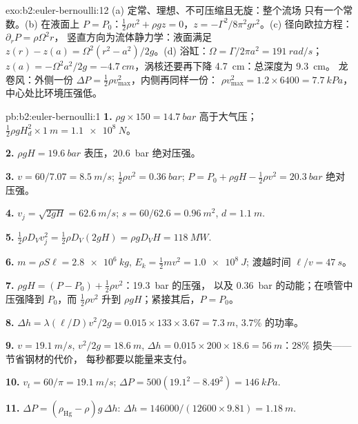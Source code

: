 \begin{solution}{exo:b2:euler-bernoulli:12}
(a) 定常、理想、不可压缩且无旋：整个流场
只有一个常数。(b) 在液面上 $P = P_0$：$\tfrac12\rho v^2 + \rho gz =
0$，$z = -\Gamma^2/8\pi^2gr^2$。(c) 径向欧拉方程：$\partial_rP = \rho\Omega^2r$，
竖直方向为流体静力学：液面满足 $z(r) - z(a) = \Omega^2(r^2 -
a^2)/2g$。(d) 浴缸：$\Omega = \Gamma/2\pi a^2 = \qty{191}{rad/s}$；$z(a) = -\Omega^2a^2/
2g = \qty{-4.7}{cm}$，涡核还要再下降 \qty{4.7}{cm}：总深度为 \qty{9.3}{cm}。
龙卷风：外侧一份 $\Delta P = \tfrac12\rho v_{\max}^2$，内侧再同样一份：
$\rho v_{\max}^2 = 1.2 \times 6400 = \qty{7.7}{kPa}$，中心处比环境压强低。
\end{solution}

\begin{solution}{pb:b2:euler-bernoulli:1}
\textbf{1.} $\rho g \times 150 = \qty{14.7}{bar}$ 高于大气压；$\tfrac12\rho gH_d^2
\times \qty{1}{m} = \qty{1.1e8}{N}$。

\textbf{2.} $\rho gH = \qty{19.6}{bar}$ 表压，\qty{20.6}{bar} 绝对压强。

\textbf{3.} $v = 60/7.07 = \qty{8.5}{m/s}$; $\tfrac12\rho v^2 = \qty{0.36}{bar}$; $P =
P_0 + \rho gH - \tfrac12\rho v^2 = \qty{20.3}{bar}$ 绝对压强。

\textbf{4.} $v_j = \sqrt{2gH} = \qty{62.6}{m/s}$; $s = 60/62.6 = \qty{0.96}{m^2}$, $d =
\qty{1.1}{m}$.

\textbf{5.} $\tfrac12\rho D_Vv_j^2 = \tfrac12\rho D_V(2gH) = \rho gD_VH = \qty{118}{MW}$.

\textbf{6.} $m = \rho S\ell = \qty{2.8e6}{kg}$, $E_k = \tfrac12mv^2 = \qty{1.0e8}{J}$;
渡越时间 $\ell/v = \qty{47}{s}$。

\textbf{7.} $\rho gH = (P - P_0) + \tfrac12\rho v^2$：\qty{19.3}{bar} 的压强，
以及 \qty{0.36}{bar} 的动能；在喷管中压强降到
$P_0$，而 $\tfrac12\rho v^2$ 升到 $\rho gH$；紧接其后，$P = P_0$。

\textbf{8.} $\Delta h = \lambda(\ell/D)v^2/2g = 0.015 \times 133 \times 3.67 = \qty{7.3}{m}$,
$3.7\%$ 的功率。

\textbf{9.} $v = \qty{19.1}{m/s}$, $v^2/2g = \qty{18.6}{m}$, $\Delta h = 0.015 \times 200 \times
18.6 = \qty{56}{m}$：$28\%$ 损失——节省钢材的代价，
每秒都要以能量来支付。

\textbf{10.} $v_t = 60/\pi = \qty{19.1}{m/s}$; $\Delta P = 500(19.1^2 - 8.49^2) =
\qty{146}{kPa}$.

\textbf{11.} $\Delta P = (\rho_{\text{Hg}} - \rho)g\,\Delta h$: $\Delta h = 146000/(12600
\times 9.81) = \qty{1.18}{m}$.


\end{solution}
